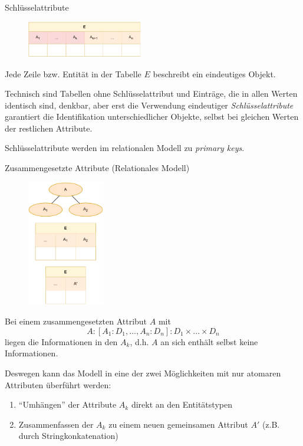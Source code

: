 \begin{defi}{Schlüsselattribute}
    \begin{figure}
        \begin{center}
            \includegraphics[width=0.45\textwidth]{includes/figures/definition_relational_modell_keys.pdf}
        \end{center}
    \end{figure}
    Jede Zeile bzw. Entität in der Tabelle $E$ beschreibt ein eindeutiges Objekt.

    Technisch sind Tabellen ohne Schlüsselattribut und Einträge, die in allen Werten identisch sind, denkbar, aber erst die Verwendung eindeutiger \emph{Schlüsselattribute} garantiert die Identifikation unterschiedlicher Objekte, selbst bei gleichen Werten der restlichen Attribute.

    Schlüsselattribute werden im relationalen Modell zu \emph{primary keys}.
\end{defi}

\begin{defi}{Zusammengesetzte Attribute (Relationales Modell)}
    \begin{figure}
        \begin{center}
            \includegraphics[width=0.3\textwidth]{includes/figures/definition_relational_modell_attribute_combined.pdf}
        \end{center}
    \end{figure}
    Bei einem zusammengesetzten Attribut $A$ mit
    \[
        A: [A_1 : D_1, \ldots, A_n:D_n]: D_1 \times \ldots \times D_n
    \]
    liegen die Informationen in den $A_k$, d.h. $A$ an sich enthält selbst keine Informationen.

    Deswegen kann das Modell in eine der zwei Möglichkeiten mit nur atomaren Attributen überführt werden:
    \begin{enumerate}
        \item \enquote{Umhängen} der Attribute $A_k$ direkt an den Entitätstypen
        \item Zusammenfassen der $A_k$ zu einem neuen gemeinsamen Attribut $A'$ (z.B. durch Stringkonkatenation)
    \end{enumerate}

    \vspace{6em}
\end{defi}

